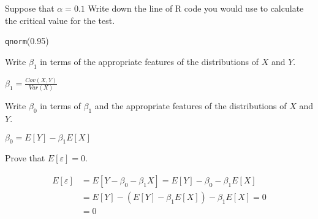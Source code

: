 \documentclass[addpoints,12pt]{exam}
\begin{document}
\begin{questions}
  \question Suppose that $\alpha = 0.1$ Write down the line of R code you would use to calculate the critical value for the test.
  \begin{solution}
    \texttt{qnorm}(0.95)
  \end{solution}







\question Write $\beta_1$ in terms of the appropriate features of the distributions of $X$ and $Y$.
\begin{solution}
  $\beta_1 = \displaystyle\frac{Cov(X,Y)}{Var(X)}$
\end{solution}

\question Write $\beta_0$ in terms of $\beta_1$ and the appropriate features of the distributions of $X$ and $Y$.
\begin{solution}
  $\beta_0 = E[Y] - \beta_1 E[X]$
\end{solution}

\question Prove that $E[\varepsilon] = 0$.
\begin{solution}
  \begin{align*}
    E[\varepsilon] &= E[Y - \beta_0 - \beta_1 X] = E[Y] - \beta_0 - \beta_1 E[X]\\
    &= E[Y] - \left( E[Y] - \beta_1 E[X] \right) - \beta_1 E[X] = 0\\
    &=0
  \end{align*}
\end{solution}


\end{questions}
\end{document}
